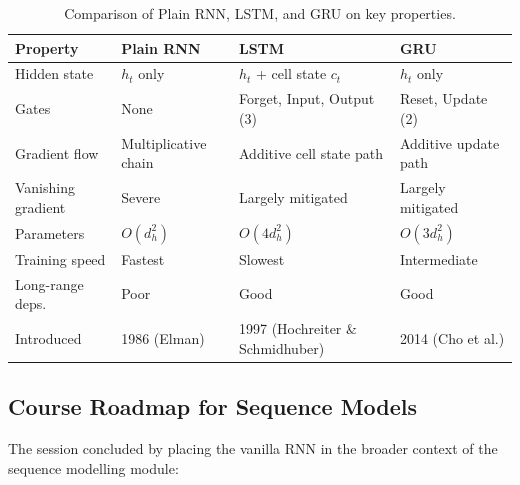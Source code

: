 \documentclass[12pt,a4paper]{article}
\begin{document}
\begin{table}[ht]
\centering
\caption{Comparison of Plain RNN, LSTM, and GRU on key properties.}
\label{tab:rnn_vs_lstm_vs_gru}
\renewcommand{\arraystretch}{1.4}
\begin{tabularx}{\textwidth}{@{}lXXX@{}}
\toprule
\textbf{Property} & \textbf{Plain RNN} & \textbf{LSTM} & \textbf{GRU} \\
\midrule
Hidden state     & $h_t$ only & $h_t$ + cell state $c_t$ & $h_t$ only \\
Gates            & None & Forget, Input, Output (3) & Reset, Update (2) \\
Gradient flow    & Multiplicative chain & Additive cell state path & Additive update path \\
Vanishing gradient & Severe & Largely mitigated & Largely mitigated \\
Parameters       & $O(d_h^2)$ & $O(4 d_h^2)$ & $O(3 d_h^2)$ \\
Training speed   & Fastest & Slowest & Intermediate \\
Long-range deps. & Poor & Good & Good \\
Introduced       & 1986 (Elman) & 1997 (Hochreiter \& Schmidhuber) & 2014 (Cho et al.) \\
\bottomrule
\end{tabularx}
\end{table}

\subsection{Course Roadmap for Sequence Models}
\label{subsec:roadmap}

The session concluded by placing the vanilla RNN in the broader context of the
sequence modelling module:
\end{document}
